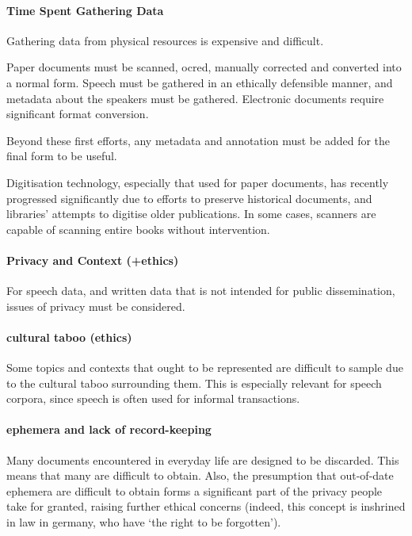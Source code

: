 


\paragraph{Time Spent Gathering Data}
Gathering data from physical resources is expensive and difficult.  

Paper documents must be scanned, ocred, manually corrected and converted into a normal form. Speech must be gathered in an ethically defensible manner, and metadata about the speakers must be gathered. Electronic documents require significant format conversion.

Beyond these first efforts, any metadata and annotation must be added for the final form to be useful.

Digitisation technology, especially that used for paper documents, has recently progressed significantly due to efforts to preserve historical documents, and libraries' attempts to digitise older publications. In some cases, scanners are capable of scanning entire books without intervention.




\paragraph{Privacy and Context (+ethics)}
For speech data, and written data that is not intended for public dissemination, issues of privacy must be considered.



\paragraph{ cultural taboo (ethics)}
Some topics and contexts that ought to be represented are difficult to sample due to the cultural taboo surrounding them. This is especially relevant for speech corpora, since speech is often used for informal transactions.


\paragraph{ ephemera and lack of record-keeping}
Many documents encountered in everyday life are designed to be discarded. This means that many are difficult to obtain. Also, the presumption that out-of-date ephemera are difficult to obtain forms a significant part of the privacy people take for granted, raising further ethical concerns (indeed, this concept is inshrined in law in germany, who have `the right to be forgotten').


